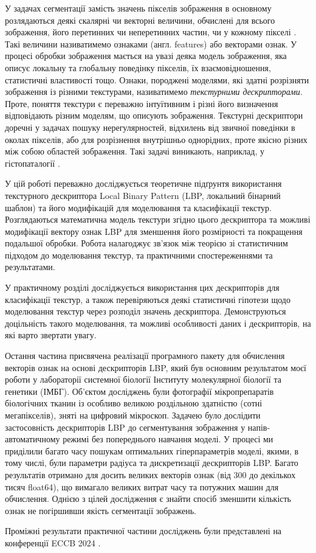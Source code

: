 У задачах сегментації замість значень пікселів зображення в основному розлядаються деякі скалярні чи векторні величини,
обчислені для всього зображення, його перетинних чи неперетинних частин, чи у кожному пікселі \cite{belsare2015, simon2018, esteva2017}. 
Такі величини називатимемо ознаками (англ. features) або векторами ознак.
У процесі обробки зображення мається на увазі деяка модель зображення, яка описує локальну та глобальну поведінку пікселів, їх взаємовідношення, статистичні властивості тощо.
Ознаки, породжені моделями, які здатні розрізняти зображення із різними текстурами, називатимемо \emph{текстурними дескрипторами}.
Проте, поняття текстури є переважно інтуїтивним і різні його визначення відповідають різним моделям, що описують зображення.  
Текстурні дескриптори доречні у задачах пошуку нерегулярностей, відхилень від звичної поведінки в околах пікселів, 
або для розрізнення внутрішньо однорідних, проте якісно різних між собою областей зображення. 
Такі задачі виникають, наприклад, у гістопаталогії \cite{simon2018}.

У цій роботі переважно досліджується теоретичне підґрунтя використання текстурного дескриптора Local Binary Pattern 
(LBP, локальний бінарний шаблон) \cite{ojala2002} та його модифікацій для моделювання та класифікації текстур.
Розглядаються математична модель текстури згідно цього дескриптора та можливі модифікації вектору ознак LBP для зменшення його розмірності та покращення подальшої обробки.
Робота налагоджує зв'язок між теорією зі статистичним підходом до моделювання текстур, та практичними спостереженнями та результатами.

У практичному розділі досліджується використання цих дескрипторів для класифікації текстур, 
а також перевіряються деякі статистичні гіпотези щодо моделювання текстур через розподіл значень дескриптора.
Демонструються доцільність такого моделювання, та можливі особливості даних і дескрипторів, на які варто звертати увагу.

Остання частина присвячена реалізації програмного пакету для обчислення векторів ознак на основі дескрипторів LBP, який був
основним результатом моєї роботи у лабораторії системної біології Інституту молекулярної біології та генетики (ІМБГ).
Об'єктом досліджень були фотографії мікропрепаратів біологічних тканин із особливо великою роздільною здатністю (сотні мегапікселів), зняті на цифровий мікроскоп.
Задачею було дослідити застосовність дескрипторів LBP до сегментування зображення у напів-автоматичному режимі без попереднього навчання моделі.
У процесі ми приділили багато часу пошукам оптимальних гіперпараметрів моделі, якими, в тому числі, були параметри радіуса та дискретизації дескрипторів LBP.
Багато результатів отримано для досить великих векторів ознак (від 300 до декількох тисяч float64), що вимагало великих витрат часу та потужних машин для обчислення.
Однією з цілей дослідження є знайти спосіб зменшити кількість ознак не погіршивши якість сегментації зображень.

Проміжні результати практичної частини досліджень були представлені на конференції ECCB 2024 \cite{fastlbp2024}.
